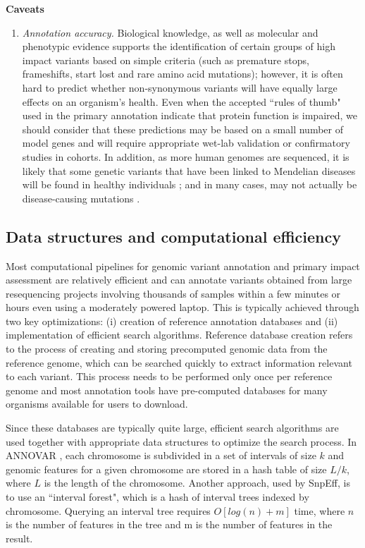 \textbf{Caveats}
	\begin{enumerate}[label=\roman*]

	\item \textit{Annotation accuracy.} Biological knowledge, as well as molecular and phenotypic evidence supports the identification of certain groups of high impact variants based on simple criteria (such as premature stops, frameshifts, start lost and rare amino acid mutations); however, it is often hard to predict whether non-synonymous variants will have equally large effects on an organism's health. Even when the accepted ``rules of thumb" used in the primary annotation indicate that protein function is impaired, we should consider that these predictions may be based on a small number of model genes and will require appropriate wet-lab validation or confirmatory studies in cohorts. In addition, as more human genomes are sequenced, it is likely that some genetic variants that have been linked to Mendelian diseases will be found in healthy individuals  \cite{riggs2013towards}; and in many cases, may not actually be disease-causing mutations  \cite{bell2011carrier}.
	
	\end{enumerate}

\subsection{Data structures and computational efficiency}

Most computational pipelines for genomic variant annotation and primary impact assessment are relatively efficient and can annotate variants obtained from large resequencing projects involving thousands of samples within a few minutes or hours even using a moderately powered laptop. This is typically achieved through two key optimizations: (i) creation of reference annotation databases and (ii) implementation of efficient search algorithms. Reference database creation refers to the process of creating and storing precomputed genomic data from the reference genome, which can be searched quickly to extract information relevant to each variant. This process needs to be performed only once per reference genome and most annotation tools have pre-computed databases for many organisms available for users to download.

Since these databases are typically quite large, efficient search algorithms are used together with appropriate data structures to optimize the search process. In ANNOVAR \cite{wang2010annovar}, each chromosome is subdivided in a set of intervals of size $k$ and genomic features for a given chromosome are stored in a hash table of size $L/k$, where $L$ is the length of the chromosome. Another approach, used by SnpEff, is to use an ``interval forest", which is a hash of interval trees  \cite{cormen2001introduction} indexed by chromosome. Querying an interval tree requires $O[log(n) + m]$ time, where $n$ is the number of features in the tree and m is the number of features in the result. 


